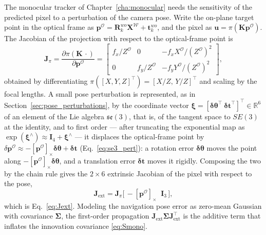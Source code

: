 The monocular tracker of Chapter~\ref{cha:monocular} needs the sensitivity of the
predicted pixel to a perturbation of the camera pose. Write the on-plane target
point in the optical frame as $\bm{p}^{\mathcal{O}}=\bm{R}^{wo}_k\bm{X}^{\mathcal{W}}+\bm{t}^{wo}_k$,
and the pixel as $\bm{u}=\pi(\bm{K}\bm{p}^{\mathcal{O}})$. The Jacobian of the
projection with respect to the optical-frame point is
\begin{equation}
  \bm{J}_{\pi}=\frac{\partial\pi(\bm{K}\,\cdot)}{\partial\bm{p}^{\mathcal{O}}}
  = \begin{bmatrix}
      f_x/Z^{\mathcal{O}} & 0 & -f_x X^{\mathcal{O}}/(Z^{\mathcal{O}})^{2}\\[2pt]
      0 & f_y/Z^{\mathcal{O}} & -f_y Y^{\mathcal{O}}/(Z^{\mathcal{O}})^{2}
    \end{bmatrix},
\end{equation}
obtained by differentiating $\pi([X,Y,Z]^{\top})=[X/Z,\,Y/Z]^{\top}$ and scaling by
the focal lengths. A small pose perturbation is represented, as in
Section~\ref{sec:pose_perturbations}, by the coordinate vector
$\bm{\xi}=[\bm{\delta\theta}^{\top}\ \bm{\delta t}^{\top}]^{\top}\in\mathbb{R}^{6}$ of an
element of the Lie algebra $\mathfrak{se}(3)$, that is, of the tangent space to
$SE(3)$ at the identity, and to first order --- after truncating the exponential
map as $\exp(\bm{\xi}^{\wedge})\approx\bm{I}_4+\bm{\xi}^{\wedge}$ --- it displaces
the optical-frame point by
$\delta\bm{p}^{\mathcal{O}}\approx-[\bm{p}^{\mathcal{O}}]_\times\bm{\delta\theta}+\bm{\delta t}$
(Eq.~\eqref{eq:se3_pert}): a rotation error $\bm{\delta\theta}$ moves the point
along $-[\bm{p}^{\mathcal{O}}]_\times\bm{\delta\theta}$, and a translation error
$\bm{\delta t}$ moves it rigidly. Composing the two by the chain rule gives the
$2\times6$ extrinsic Jacobian of the pixel with respect to the pose,
\begin{equation}
  \bm{J}_{\mathrm{ext}}=\bm{J}_{\pi}\big[\,-[\bm{p}^{\mathcal{O}}]_\times \;\; \bm{I}_3\,\big],
\end{equation}
which is Eq.~\eqref{eq:Jext}. Modeling the navigation pose error as zero-mean
Gaussian with covariance $\bm{\Sigma}$, the first-order propagation
$\bm{J}_{\mathrm{ext}}\bm{\Sigma}\bm{J}_{\mathrm{ext}}^{\top}$ is the additive term
that inflates the innovation covariance \eqref{eq:Smono}.
